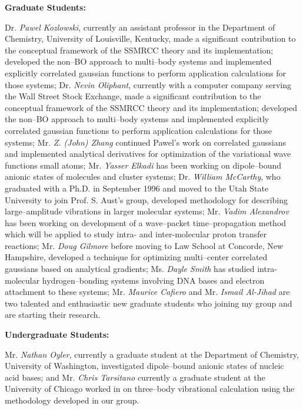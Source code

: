 \noindent
{\bf Graduate Students:}

\noindent
Dr. {\em Pawel Kozlowski}, currently an assistant professor
in the Department of Chemistry, 
University of Louisville, Kentucky,
made a significant contribution to the conceptual
framework of the SSMRCC theory and its implementation;
developed the non--BO approach
to multi--body systems and implemented explicitly
correlated gaussian functions to perform application
calculations for those systems;
Dr. {\em Nevin Oliphant}, currently 
with a computer company serving the Wall Street Stock Exchange,
made a significant contribution to the conceptual 
framework of the SSMRCC theory and its implementation;
developed the non--BO approach 
to multi--body systems and implemented explicitly
correlated gaussian functions to perform application 
calculations for those systems; 
Mr. {\em Z. (John) Zhang}
continued Pawel's work on correlated gaussians and 
implemented analytical derivatives for optimization of the
variational wave functions small atoms;
Mr. {\em Yasser Elkadi}
has been working on 
dipole--bound anionic states of molecules and cluster
systems; 
Dr. {\em William McCarthy}, 
who graduated 
with a Ph.D. in September 1996 and moved to the Utah
State University to join Prof. S. Aust's group,  
developed methodology for describing
large--amplitude vibrations in larger molecular systems; 
Mr. {\em Vadim Alexandrov} has been working on
development of a wave--packet time--propagation method which will
be applied to study intra- and inter-molecular proton transfer
reactions; 
Mr. {\em Doug Gilmore} before moving to Law School at Concorde,
New Hampshire,
developed a technique for
optimizing multi--center correlated gaussians
based on analytical gradients; 
Ms. {\em Dayle Smith} 
has studied 
intra-molecular hydrogen--bonding
systems involving DNA bases and electron attachment to these
systems;   
Mr. {\em Maurice Cafiero} 
and Mr. {\em Ismail Al-Jihad} are two talented and 
enthusiastic new graduate students who
joining my group and are starting their research. 

\vspace{2mm}
\noindent
{\bf Undergraduate Students:}

\noindent
Mr. {\em Nathan Oyler}, 
currently a graduate student at the Department of
Chemistry, University of Washington, investigated 
dipole--bound anionic states of nucleic acid bases; and 
Mr. {\em Chris Tarsitano} currently a graduate student at the 
University of Chicago 
worked in  
on three--body vibrational calculation using the methodology
developed in our group.

